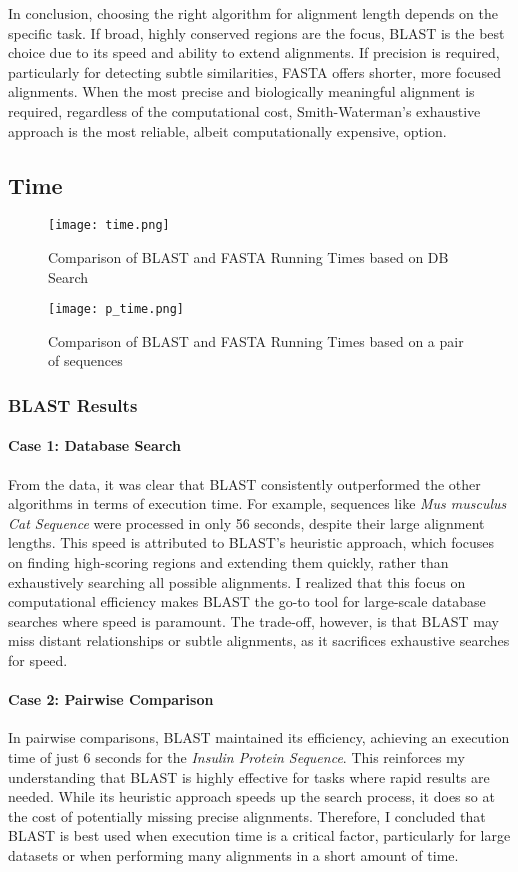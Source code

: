 \documentclass{article}
\begin{document}
In conclusion, choosing the right algorithm for alignment length depends on the specific task. If broad, highly conserved regions are the focus, BLAST is the best choice due to its speed and ability to extend alignments. If precision is required, particularly for detecting subtle similarities, FASTA offers shorter, more focused alignments. When the most precise and biologically meaningful alignment is required, regardless of the computational cost, Smith-Waterman’s exhaustive approach is the most reliable, albeit computationally expensive, option.

\subsection{Time}
\begin{figure}[H]
  \centering
  \texttt{[image: time.png]}
  \caption{Comparison of BLAST and FASTA Running Times based on DB Search}
  \label{fig:yourlabel}
\end{figure}
\begin{figure}[H]
  \centering
  \texttt{[image: p\_time.png]}
  \caption{Comparison of BLAST and FASTA Running Times based on a pair of sequences}
  \label{fig:yourlabel}
\end{figure}

\subsubsection{ BLAST Results}

\paragraph{Case 1: Database Search}
From the data, it was clear that BLAST consistently outperformed the other algorithms in terms of execution time. For example, sequences like \textit{Mus musculus Cat Sequence} were processed in only 56 seconds, despite their large alignment lengths. This speed is attributed to BLAST’s heuristic approach, which focuses on finding high-scoring regions and extending them quickly, rather than exhaustively searching all possible alignments. I realized that this focus on computational efficiency makes BLAST the go-to tool for large-scale database searches where speed is paramount. The trade-off, however, is that BLAST may miss distant relationships or subtle alignments, as it sacrifices exhaustive searches for speed.

\paragraph{Case 2: Pairwise Comparison}
In pairwise comparisons, BLAST maintained its efficiency, achieving an execution time of just 6 seconds for the \textit{Insulin Protein Sequence}. This reinforces my understanding that BLAST is highly effective for tasks where rapid results are needed. While its heuristic approach speeds up the search process, it does so at the cost of potentially missing precise alignments. Therefore, I concluded that BLAST is best used when execution time is a critical factor, particularly for large datasets or when performing many alignments in a short amount of time.
\end{document}
